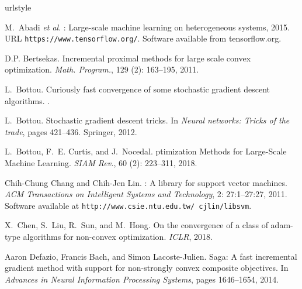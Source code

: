 \begin{thebibliography}{42}
\providecommand{\natexlab}[1]{#1}
\providecommand{\url}[1]{\texttt{#1}}
\expandafter\ifx\csname urlstyle\endcsname\relax
  \providecommand{\doi}[1]{doi: #1}\else
  \providecommand{\doi}{doi: \begingroup \urlstyle{rm}\Url}\fi

M.~Abadi {\emph{et al}}.
: Large-scale machine learning on heterogeneous systems,
  2015.
\newblock URL \url{https://www.tensorflow.org/}.
\newblock Software available from tensorflow.org.

D.P. Bertsekas.
\newblock Incremental proximal methods for large scale convex optimization.
\newblock \emph{Math. Program.}, 129 (2): 163--195, 2011.

L.~Bottou.
\newblock Curiously fast convergence of some stochastic gradient descent
  algorithms.
.

L.~Bottou.
\newblock Stochastic gradient descent tricks.
\newblock In \emph{Neural networks: Tricks of the trade}, pages 421--436.
  Springer, 2012.

L.~Bottou, F.~E. Curtis, and J.~Nocedal.
ptimization {M}ethods for {L}arge-{S}cale {M}achine {L}earning.
\newblock \emph{SIAM Rev.}, 60 (2): 223--311, 2018.

Chih-Chung Chang and Chih-Jen Lin.
: A library for support vector machines.
\newblock \emph{ACM Transactions on Intelligent Systems and Technology},
  2: 27:1--27:27, 2011.
\newblock Software available at \url{http://www.csie.ntu.edu.tw/~cjlin/libsvm}.

X.~Chen, S.~Liu, R.~Sun, and M.~Hong.
\newblock On the convergence of a class of adam-type algorithms for non-convex
  optimization.
\newblock \emph{ICLR}, 2018.

Aaron Defazio, Francis Bach, and Simon Lacoste-Julien.
\newblock Saga: A fast incremental gradient method with support for
  non-strongly convex composite objectives.
\newblock In \emph{Advances in Neural Information Processing Systems}, pages
  1646--1654, 2014.


\end{thebibliography}
